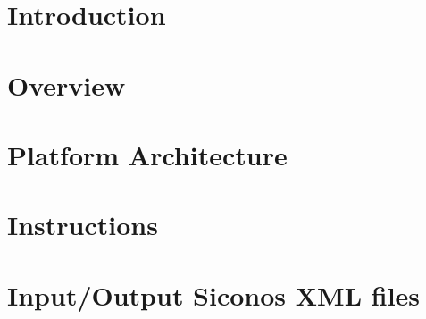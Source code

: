\documentclass[a4paper,twoside,openright,makeidx,12pt]{book}
\begin{document}
\pagestyle{empty}
\renewcommand{\arraystretch}{1.8}



\tableofcontents
\cleardoublepage

\pagestyle{fancy}
\clearpage
{}


\chapter{Introduction}
\label{Sec:UM-Intoduction}


\chapter{Overview}
\label{Sec:UM-Overview}


\chapter{Platform Architecture}
\label{Sec:UM-Archi}


\chapter{Instructions}
\label{Sec:UM-Intructions}


\chapter{Input/Output Siconos XML files}
\label{Sec:UM-XML}


\end{document}
